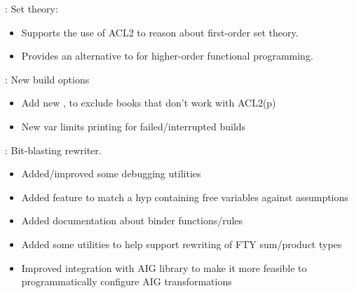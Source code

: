 
\begin{frame}

\newlibtitle

:
Set theory:
\begin{itemize}
\item Supports the use of ACL2 to reason about first-order set theory.
\item Provides an alternative to  for higher-order
      functional programming.
\end{itemize}

\end{frame}


\begin{frame}

\implibtitle

: New build options
\begin{itemize}
\item Add new  , to exclude books that don't work with ACL2(p)
\item New  var limits printing for failed/interrupted builds
\end{itemize}

\end{frame}


\begin{frame}

\implibtitle

:
Bit-blasting rewriter.
\begin{itemize}
\item Added/improved some debugging utilities
\item Added feature to match a hyp containing free variables against assumptions
\item Added documentation about binder functions/rules
\item Added some utilities to help support rewriting of FTY sum/product types
\item Improved integration with AIG library to make it more feasible
  to programmatically configure AIG transformations
\end{itemize}

\end{frame}

